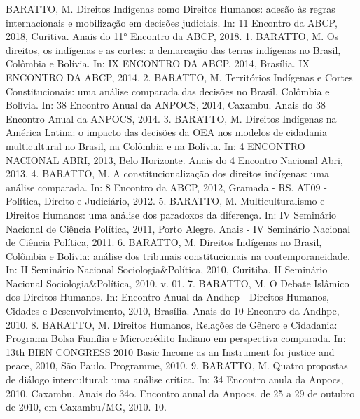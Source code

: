 \begin{cvhonors}
  \cvhonor
    {BARATTO, M.}
    {Direitos Indígenas como Direitos Humanos: adesão às regras internacionais e mobilização em decisões judiciais. In: 11 Encontro da ABCP, 2018, Curitiva. Anais do 11° Encontro da ABCP, 2018.}
    {}
    {1. }
  \cvhonor
    {BARATTO, M.}
    {Os direitos, os indígenas e as cortes: a demarcação das terras indígenas no Brasil, Colômbia e Bolívia. In: IX ENCONTRO DA ABCP, 2014, Brasília. IX ENCONTRO DA ABCP, 2014.}
    {}
    {2. }
  \cvhonor
    {BARATTO, M.}
    {Territórios Indígenas e Cortes Constitucionais: uma análise comparada das decisões no Brasil, Colômbia e Bolívia. In: 38 Encontro Anual da ANPOCS, 2014, Caxambu. Anais do 38 Encontro Anual da ANPOCS, 2014.}
    {}
    {3. }
  \cvhonor
    {BARATTO, M.}
    {Direitos Indígenas na América Latina: o impacto das decisões da OEA nos modelos de cidadania multicultural no Brasil, na Colômbia e na Bolívia. In: 4 ENCONTRO NACIONAL ABRI, 2013, Belo Horizonte. Anais do 4 Encontro Nacional Abri, 2013.}
    {}
    {4. }
  \cvhonor
    {BARATTO, M.}
    {A constitucionalização dos direitos indígenas: uma análise comparada. In: 8 Encontro da ABCP, 2012, Gramada - RS. AT09 - Política, Direito e Judiciário, 2012.}
    {}
    {5. }
  \cvhonor
    {BARATTO, M.}
    {Multiculturalismo e Direitos Humanos: uma análise dos paradoxos da diferença. In: IV Seminário Nacional de Ciência Política, 2011, Porto Alegre. Anais - IV Seminário Nacional de Ciência Política, 2011.}
    {}
    {6. }
  \cvhonor
    {BARATTO, M.}
    {Direitos Indígenas no Brasil, Colômbia e Bolívia: análise dos tribunais constitucionais na contemporaneidade. In: II Seminário Nacional Sociologia\&Política, 2010, Curitiba. II Seminário Nacional Sociologia\&Política, 2010. v. 01.}
    {}
    {7. }
  \cvhonor
    {BARATTO, M.}
    {O Debate Islâmico dos Direitos Humanos. In: Encontro Anual da Andhep - Direitos Humanos, Cidades e Desenvolvimento, 2010, Brasília. Anais do 10 Encontro da Andhpe, 2010.}
    {}
    {8. }
  \cvhonor
    {BARATTO, M.}
    {Direitos Humanos, Relações de Gênero e Cidadania: Programa Bolsa Família e Microcrédito Indiano em perspectiva comparada. In: 13th BIEN CONGRESS 2010 Basic Income as an Instrument for justice and peace, 2010, São Paulo. Programme, 2010.}
    {}
    {9. }
  \cvhonor
    {BARATTO, M.}
    {Quatro propostas de diálogo intercultural: uma análise crítica. In: 34 Encontro anula da Anpocs, 2010, Caxambu. Anais do 34o. Encontro anual da Anpocs, de 25 a 29 de outubro de 2010, em Caxambu/MG, 2010.}
    {}
    {10. }
  \end{cvhonors}
